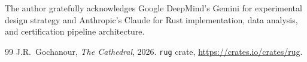 \documentclass[11pt,a4paper]{article}
\begin{document}
The author gratefully acknowledges Google DeepMind's Gemini for
experimental design strategy and Anthropic's Claude for Rust
implementation, data analysis, and certification pipeline architecture.

\begin{thebibliography}{99}
J.R.~Gochanour, \emph{The Cathedral}, 2026.
\texttt{rug} crate, \url{https://crates.io/crates/rug}.
\end{thebibliography}
\end{document}
